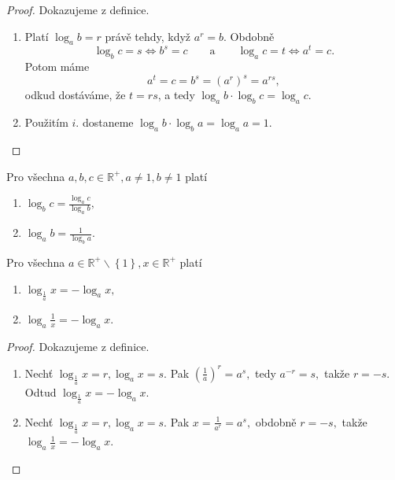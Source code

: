 \begin{proof}
    Dokazujeme z definice.
    \begin{enumerate}[$i.$]
        \item
            Platí $\log_a b = r$ právě tehdy, když $a^r = b.$ Obdobně
            $$\log_b c = s \iff b^s = c \qquad \text{a} \qquad \log_a c = t \iff a^t = c.$$
            Potom máme
            $$
                a^t=c =b^s=\left ( a^r \right )^s = a^{rs},
            $$
            odkud dostáváme, že $t=rs$, a tedy
            $ \log_a b \cdot \log_b c = \log_a c$.
        \item Použitím $i.$ dostaneme $\log_a b\cdot \log_b a = \log_a a = 1.$\qedhere
    \end{enumerate}
\end{proof}

\begin{veta}
    Pro všechna $ a,b,c\in \mathbb R^+, a\ne 1, b\ne 1$ platí
    \begin{enumerate}[$i.$]
        \item $\log_b c = \frac{\log_a c}{\log_a b},$
       	\item $\log_a b = \frac{1}{\log_b a}.$
    \end{enumerate}
\end{veta}

\begin{veta}
    Pro všechna $a \in \mathbb R^+ \smallsetminus \left \{ 1 \right \}  , x \in \mathbb R^+$ platí
    \begin{enumerate}[$i.$]
        \item $\log_{\frac{1}{a}} x = -\log_a x,$
       	\item $\log_a \frac{1}{x} = -\log_a x.$
    \end{enumerate}
\end{veta}

\begin{proof}
    Dokazujeme z definice.
    \begin{enumerate}[$i.$]
        \item Nechť $\log_{\frac{1}{a}} x = r, \log_a x = s.$ Pak
        $\left ( \frac{1}{a} \right )^r = a^s,$ tedy $a^{-r}=s,$ takže $r=-s$.
        Odtud $\log_{\frac{1}{a}} x = -\log_a x.$
       	\item Nechť $\log_{\frac{1}{a}} x = r, \log_a x = s.$ Pak
        $x = \frac{1}{a^r}=a^s,$ obdobně $r=-s,$ takže $\log_a \frac{1}{x}=
        -\log_a x.$\qedhere
    \end{enumerate}
\end{proof}

